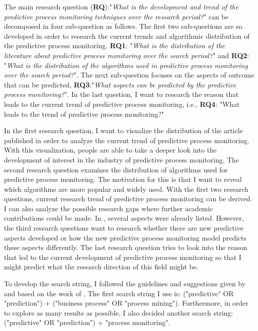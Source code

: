 \documentclass[runningheads]{llncs}
\begin{document}
		The main research question (\textbf{RQ}):"\textit{What is the development and trend of the predictive process monitoring techniques over the research period?}" can be decomposed in four sub-question as follows. The first two sub-questions are so developed in order to research the current trends and algorithmic distribution of the predictive process monitoring. \textbf{RQ1}: "\textit{What is the distribution of the literature about predictive process monitoring over the search period?}" and \textbf{RQ2}: "\textit{What is the distribution of the algorithms used in predictive process monitoring over the search period?}". The next sub-question focuses on the aspects of outcome that can be predicted, \textbf{RQ3}:"\textit{What aspects can be predicted by the predictive process monitoring?}". In the last question, I want to research the reason that leads to the current trend of predictive process monitoring, i.e., \textbf{RQ4}: "What leads to the trend of predictive process monitoring?"
		
		In the first research question, I want to visualize the distribution of the article published in order to analyze the current trend of predictive process monitoring. With this visualization, people are able to take a deeper look into the development of interest in the industry of predictive process monitoring. The second research question examines the distribution of algorithms used for predictive process monitoring. The motivation for this is that I want to reveal which algorithms are more popular and widely used. With the first two research questions, current research trend of predictive process monitoring can be derived. I can also analyze the possible research gaps where further academic contributions could be made. In \cite{ref1}, several aspects were already listed. However, the third research questions want to research whether there are new predictive aspects developed or how the new predictive process monitoring model predicts these aspects differently. The last research question tries to look into the reason that led to the current development of predictive process monitoring so that I might predict what the research direction of this field might be.
		
		To develop the search string, I followed the guidelines and suggestions given by \cite{ref2} and based on the work of \cite{ref1}, The first search string I use is: ("predictive" OR "prediction") + ("business process" OR "process mining"). Furthermore, in order to explore as many results as possible, I also decided another search string: ("predictive" OR "prediction") + "process monitoring". 
		
\end{document}
